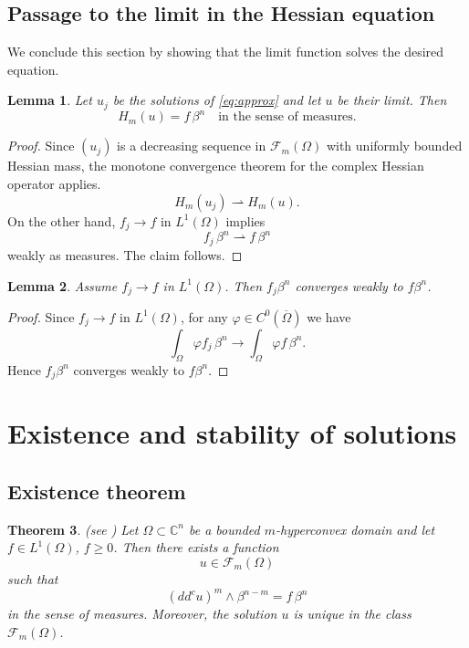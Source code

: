 \documentclass[11pt,reqno]{amsart}
\newtheorem{theorem}{Theorem}[section]
\newtheorem{lemma}[theorem]{Lemma}
\theoremstyle{definition}
\theoremstyle{remark}
\newcommand{\ddc}{dd^c}
\begin{document}
	\subsection{Passage to the limit in the Hessian equation}
	
	We conclude this section by showing that the limit function solves the desired equation.
	
	\begin{lemma}\label{lem:limit}
		Let $u_j$ be the solutions of \eqref{eq:approx} and let $u$ be their limit.
		Then
		\[
		H_m(u) = f \, \beta^n
		\quad \text{in the sense of measures}.
		\]
	\end{lemma}
	
	\begin{proof}
		Since $(u_j)$ is a decreasing sequence in $\mathcal F_m(\Omega)$ with
		uniformly bounded Hessian mass, the monotone convergence theorem for
		the complex Hessian operator applies.
		\[
		H_m(u_j) \rightharpoonup H_m(u).
		\]
		On the other hand, $f_j \to f$ in $L^1(\Omega)$ implies
		\[
		f_j \, \beta^n \rightharpoonup f \, \beta^n
		\]
		weakly as measures.
		The claim follows.
	\end{proof}
	\begin{lemma}\label{lem:L1limit}
		Assume $f_j\to f$ in $L^1(\Omega)$.
		Then $f_j\beta^n$ converges weakly to $f\beta^n$.
	\end{lemma}
	\begin{proof}
		Since $f_j \to f$ in $L^1(\Omega)$, for any $\varphi \in C^0(\overline{\Omega})$ we have
		\[
		\int_\Omega \varphi f_j \,\beta^n \to \int_\Omega \varphi f \,\beta^n.
		\]
		Hence $f_j\beta^n$ converges weakly to $f\beta^n$.
	\end{proof}
	
	
	
	\section{Existence and stability of solutions}
	
	
	
	
	\subsection{Existence theorem}
	
	\begin{theorem}\label{thm:existence}
		(see \cite{Lu})
		Let $\Omega \subset \mathbb{C}^n$ be a bounded $m$-hyperconvex domain and let
		$f \in L^1(\Omega)$, $f \ge 0$.
		Then there exists a function
		\[
		u \in \mathcal{F}_m(\Omega)
		\]
		such that
		\begin{equation}\label{eq:existence}
			(\ddc u)^m \wedge \beta^{n-m} = f \, \beta^n
		\end{equation}
		in the sense of measures.
		Moreover, the solution $u$ is unique in the class $\mathcal{F}_m(\Omega)$.
	\end{theorem}
	
\end{document}
